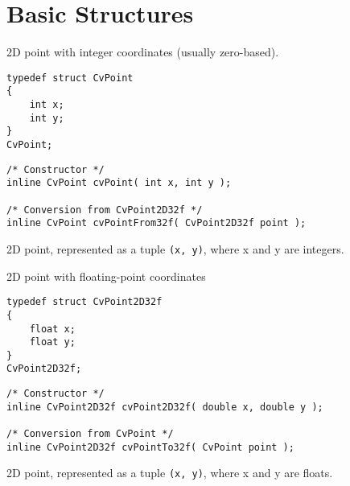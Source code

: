 \section{Basic Structures}


\ifCPy
\label{CvPoint}
2D point with integer coordinates (usually zero-based).

\ifC %
\begin{lstlisting}
typedef struct CvPoint
{
    int x; 
    int y; 
}
CvPoint;
\end{lstlisting}

\begin{description}
\end{description}

\begin{lstlisting}
/* Constructor */
inline CvPoint cvPoint( int x, int y );

/* Conversion from CvPoint2D32f */
inline CvPoint cvPointFrom32f( CvPoint2D32f point );
\end{lstlisting}
\else %
2D point, represented as a tuple \texttt{(x, y)}, where x and y are integers.
\fi %

\label{CvPoint2D32f}
2D point with floating-point coordinates

\ifC %
\begin{lstlisting}
typedef struct CvPoint2D32f
{
    float x;
    float y; 
}
CvPoint2D32f;
\end{lstlisting}

\begin{description}
\end{description}

\begin{lstlisting}
/* Constructor */
inline CvPoint2D32f cvPoint2D32f( double x, double y );

/* Conversion from CvPoint */
inline CvPoint2D32f cvPointTo32f( CvPoint point );
\end{lstlisting}
\else %
2D point, represented as a tuple \texttt{(x, y)}, where x and y are floats.
\fi %


